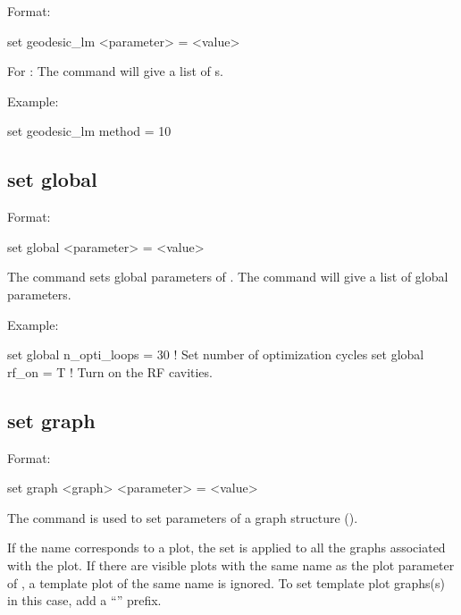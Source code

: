 {{Format:
\begin{example}
  set geodesic_lm <parameter> = <value>
\end{example}

For : The  command will give a list of
s.

Example:
\begin{example}
  set geodesic_lm method = 10
\end{example}


\subsection{set global}
\label{s:set.global}

Format:
\begin{example}
  set global <parameter> = <value>
\end{example}

The  command sets global parameters of \tao. The  command will give
a list of global parameters.

Example:
\begin{example}
  set global n_opti_loops = 30  ! Set number of optimization cycles
  set global rf_on = T          ! Turn on the RF cavities.
\end{example}


\subsection{set graph}
\label{s:set.graph}

Format:
\begin{example}
  set graph <graph> <parameter> = <value>
\end{example}

The  command is used to set parameters of a graph structure ().

If the  name corresponds to a plot, the set is applied to all the graphs associated with
the plot. If there are visible plots with the same name as the plot parameter of , a
template plot of the same name is ignored. To set template plot graphs(s) in this case, add a
``'' prefix.

}}
